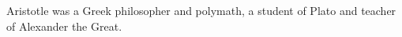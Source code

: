 \begin{relatedwork} \label{relwk:AdditionalResources_01.01} 
Aristotle was a Greek philosopher and polymath, a student of Plato and teacher of Alexander the Great.
\end{relatedwork}